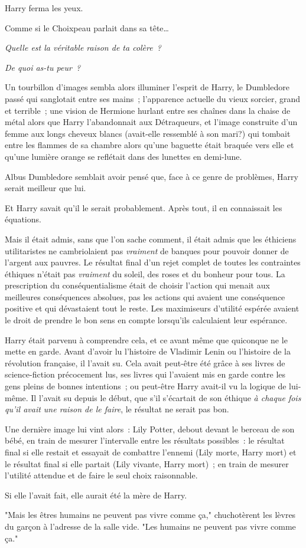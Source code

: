 Harry ferma les yeux.

Comme si le Choixpeau parlait dans sa tête…

\emph{Quelle est la véritable raison de ta colère~?}

\emph{De quoi as-tu peur~?}

Un tourbillon d'images sembla alors illuminer l'esprit de Harry, le Dumbledore passé qui sanglotait entre ses mains~; l'apparence actuelle du vieux sorcier, grand et terrible~; une vision de Hermione hurlant entre ses chaînes dans la chaise de métal alors que Harry l'abandonnait aux Détraqueurs, et l'image construite d'un femme aux longs cheveux blancs (avait-elle ressemblé à son mari?) qui tombait entre les flammes de sa chambre alors qu'une baguette était braquée vers elle et qu'une lumière orange se reflétait dans des lunettes en demi-lune.

Albus Dumbledore semblait avoir pensé que, face à ce genre de problèmes, Harry serait meilleur que lui.

Et Harry savait qu'il le serait probablement. Après tout, il en connaissait les équations.

Mais il était admis, sans que l'on sache comment, il était admis que les éthiciens utilitaristes ne cambriolaient pas \emph{vraiment} de banques pour pouvoir donner de l'argent aux pauvres. Le résultat final d'un rejet complet de toutes les contraintes éthiques n'était pas \emph{vraiment} du soleil, des roses et du bonheur pour tous. La prescription du conséquentialisme était de choisir l'action qui menait aux meilleures conséquences absolues, pas les actions qui avaient une conséquence positive et qui dévastaient tout le reste. Les maximiseurs d'utilité espérée avaient le droit de prendre le bon sens en compte lorsqu'ils calculaient leur espérance.

Harry était parvenu à comprendre cela, et ce avant même que quiconque ne le mette en garde. Avant d'avoir lu l'histoire de Vladimir Lenin ou l'histoire de la révolution française, il l'avait su. Cela avait peut-être été grâce à ses livres de science-fiction précocement lus, ses livres qui l'avaient mis en garde contre les gens pleins de bonnes intentions~; ou peut-être Harry avait-il vu la logique de lui-même. Il l'avait su depuis le début, que s'il s'écartait de son éthique \emph{à chaque fois qu'il avait une raison de le faire}, le résultat ne serait pas bon.

Une dernière image lui vint alors~: Lily Potter, debout devant le berceau de son bébé, en train de mesurer l'intervalle entre les résultats possibles~: le résultat final si elle restait et essayait de combattre l'ennemi (Lily morte, Harry mort) et le résultat final si elle partait (Lily vivante, Harry mort)~; en train de mesurer l'utilité attendue et de faire le seul choix raisonnable.

Si elle l'avait fait, elle aurait été la mère de Harry.

"Mais les êtres humains ne peuvent pas vivre comme ça," chuchotèrent les lèvres du garçon à l'adresse de la salle vide. "Les humains ne peuvent pas vivre comme ça." 

